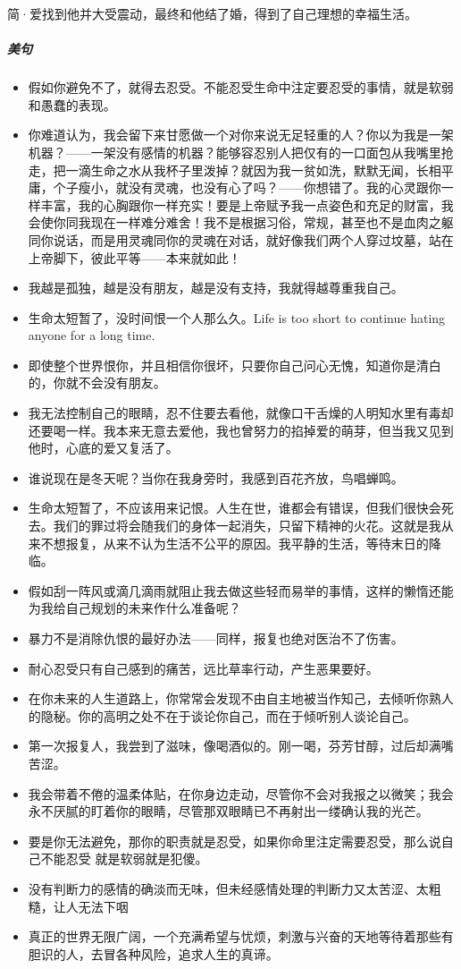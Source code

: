 \documentclass[UTF8,a4paper,8pt]{ctexbook}
\begin{document}
	简·爱找到他并大受震动，最终和他结了婚，得到了自己理想的幸福生活。
	
	\subparagraph{美句}
		\begin{itemize}
			\item  假如你避免不了，就得去忍受。不能忍受生命中注定要忍受的事情，就是软弱和愚蠢的表现。
			\item  你难道认为，我会留下来甘愿做一个对你来说无足轻重的人？你以为我是一架机器？——一架没有感情的机器？能够容忍别人把仅有的一口面包从我嘴里抢走，把一滴生命之水从我杯子里泼掉？就因为我一贫如洗，默默无闻，长相平庸，个子瘦小，就没有灵魂，也没有心了吗？——你想错了。我的心灵跟你一样丰富，我的心胸跟你一样充实！要是上帝赋予我一点姿色和充足的财富，我会使你同我现在一样难分难舍！我不是根据习俗，常规，甚至也不是血肉之躯同你说话，而是用灵魂同你的灵魂在对话，就好像我们两个人穿过坟墓，站在上帝脚下，彼此平等——本来就如此！
			\item  我越是孤独，越是没有朋友，越是没有支持，我就得越尊重我自己。
			\item  生命太短暂了，没时间恨一个人那么久。Life is too short to continue hating anyone for a long time.
			\item  即使整个世界恨你，并且相信你很坏，只要你自己问心无愧，知道你是清白的，你就不会没有朋友。
			\item  我无法控制自己的眼睛，忍不住要去看他，就像口干舌燥的人明知水里有毒却还要喝一样。我本来无意去爱他，我也曾努力的掐掉爱的萌芽，但当我又见到他时，心底的爱又复活了。
			\item  谁说现在是冬天呢？当你在我身旁时，我感到百花齐放，鸟唱蝉鸣。
			\item  生命太短暂了，不应该用来记恨。人生在世，谁都会有错误，但我们很快会死去。我们的罪过将会随我们的身体一起消失，只留下精神的火花。这就是我从来不想报复，从来不认为生活不公平的原因。我平静的生活，等待末日的降临。
			\item  假如刮一阵风或滴几滴雨就阻止我去做这些轻而易举的事情，这样的懒惰还能为我给自己规划的未来作什么准备呢？
			\item  暴力不是消除仇恨的最好办法——同样，报复也绝对医治不了伤害。
			\item  耐心忍受只有自己感到的痛苦，远比草率行动，产生恶果要好。
			\item  在你未来的人生道路上，你常常会发现不由自主地被当作知己，去倾听你熟人的隐秘。你的高明之处不在于谈论你自己，而在于倾听别人谈论自己。
			\item  第一次报复人，我尝到了滋味，像喝酒似的。刚一喝，芬芳甘醇，过后却满嘴苦涩。
			\item  我会带着不倦的温柔体贴，在你身边走动，尽管你不会对我报之以微笑；我会永不厌腻的盯着你的眼睛，尽管那双眼睛已不再射出一缕确认我的光芒。
			\item  要是你无法避免，那你的职责就是忍受，如果你命里注定需要忍受，那么说自己不能忍受 就是软弱就是犯傻。
			\item  没有判断力的感情的确淡而无味，但未经感情处理的判断力又太苦涩、太粗糙，让人无法下咽
			\item  真正的世界无限广阔，一个充满希望与忧烦，刺激与兴奋的天地等待着那些有胆识的人，去冒各种风险，追求人生的真谛。
		\end{itemize}
		
\end{document}

